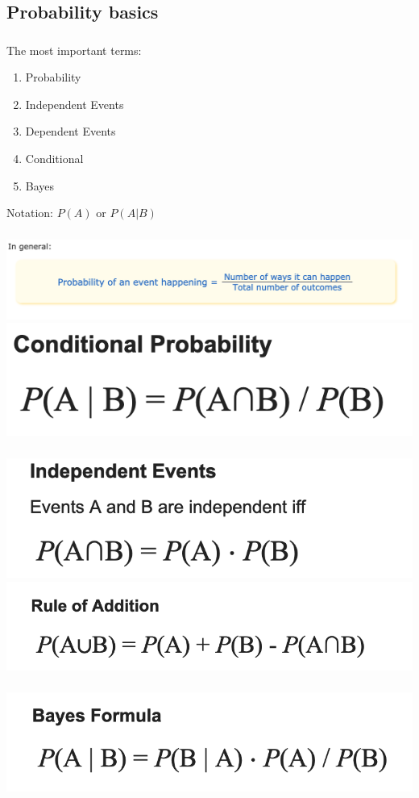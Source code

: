 \documentclass[t, 11pt]{beamer}
\begin{document}
\subsection{Probability basics}
\begin{frame} 
	\frametitle{\insertsection} 
	\frametitle{\insertsubsection} 
	The most important terms:
	\begin{enumerate}
		\item Probability
		\item Independent Events 
		\item Dependent Events
		\item Conditional 
		\item Bayes
	\end{enumerate}
\vspace{1cm}
Notation: $P(A)$ or $P(A|B)$
\end{frame}

\begin{frame} 
	\frametitle{} 
	\frametitle{} 
	\includegraphics[scale=0.4]{prob}	
	\includegraphics[scale=0.6]{cond}	
\end{frame}	

\begin{frame} 
	\frametitle{} 
	\frametitle{} 
	\includegraphics[scale=0.6]{and_prob}	
	\includegraphics[scale=0.6]{or_prob}	
\end{frame}	

\begin{frame} 
	\frametitle{} 
	\frametitle{} 
	\includegraphics[scale=0.6]{Bayes}	
\end{frame}	
\end{document}

